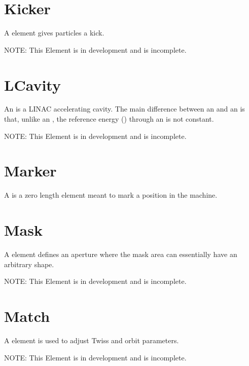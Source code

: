 \section{Kicker}
\label{s:kicker}

A  element gives particles a kick.

NOTE: This Element is in development and is incomplete.

\section{LCavity}
\label{s:lcavity}

An  is a LINAC accelerating cavity.  The main difference between an  and an
 is that, unlike an , the reference energy () through
an  is not constant.

NOTE: This Element is in development and is incomplete.

\section{Marker}
\label{s:marker}

A  is a zero length element meant to mark a position in the machine. 

\section{Mask}
\label{s:mask}

A  element defines an aperture where the mask area can
essentially have an arbitrary shape. 

NOTE: This Element is in development and is incomplete.

\section{Match}
\label{s:match}

A  element is used to adjust Twiss and orbit parameters.

NOTE: This Element is in development and is incomplete.

